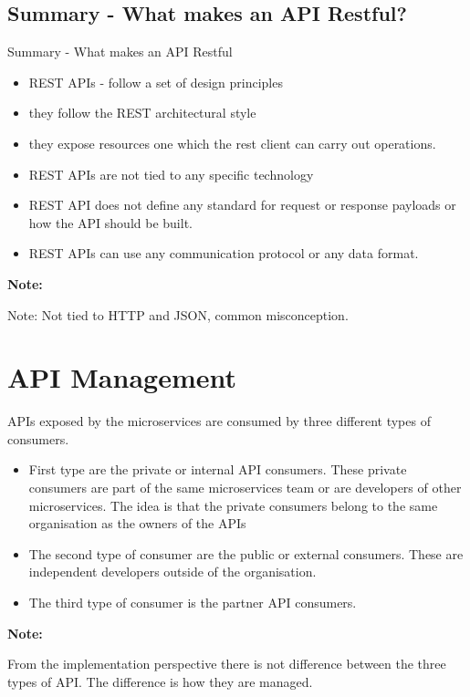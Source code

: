 \documentclass[a4paper, 11pt]{book}
\newenvironment{note}{
    \begin{siderule}
        \textbf{Note: }
        }{
    \end{siderule}
}
\begin{document}
    \subsection{Summary - What makes an API Restful?}
    Summary - What makes an API Restful
    \begin{itemize}
        \item REST APIs - follow a set of design principles
        \item they follow the REST architectural style
        \item they expose resources one which the rest client can carry out operations.
        \item REST APIs are not tied to any specific technology
        \item REST API does not define any standard for request or response payloads or how the API should be built.
        \item REST APIs can use any communication protocol or any data format.
    \end{itemize}

    \begin{note}
        Note: Not tied to HTTP and JSON, common misconception.
    \end{note}


    \section{API Management}
    APIs exposed by the microservices are consumed by three different types of consumers.
    \begin{itemize}
        \item First type are the private or internal API consumers. These private consumers are part of the same microservices team or are developers of other microservices. The idea is that the private consumers belong to the same organisation as the owners of the APIs
        \item The second type of consumer are the public or external consumers. These are independent developers outside of the organisation.
        \item The third type of consumer is the partner API consumers.
    \end{itemize}

    \begin{note}
        From the implementation perspective there is not difference between the three types of API.
        The difference is how they are managed.
    \end{note}
\end{document}
